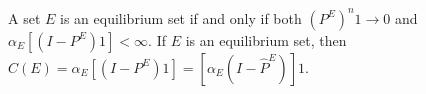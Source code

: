 A set $E$ is an equilibrium set if and only if both $(P^E)^n 1 \to 0$ and $\alpha_E[(I - P^E)1] < \infty$. If $E$ is an equilibrium set, then $C(E) = \alpha_E[(I - P^E)1] = [\alpha_E(I - \hat{P}^E)]1$.